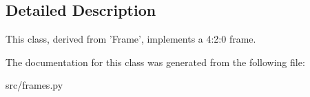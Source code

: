 \subsection{Detailed Description}
\begin{DoxyVerb}This class, derived from 'Frame', implements a 4:2:0 frame.
\end{DoxyVerb}
 

The documentation for this class was generated from the following file\+:\begin{DoxyCompactItemize}
\item 
src/frames.\+py\end{DoxyCompactItemize}
